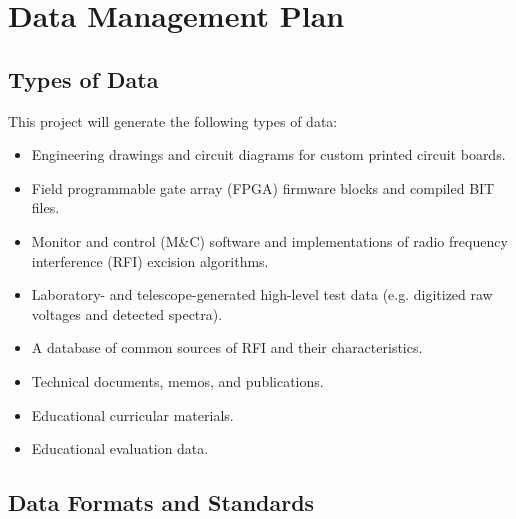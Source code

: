 \documentclass[10pt]{NSF}
\begin{document}
\section{Data Management Plan}
\label{sec:data_plan}

\subsection{Types of Data}

This project will generate the following types of data:
\begin{itemize}
\item{Engineering drawings and circuit diagrams for custom printed
  circuit boards.}
\item{Field programmable gate array (FPGA) firmware blocks and
  compiled BIT files.}
\item{Monitor and control (M\&C) software and implementations of radio
  frequency interference (RFI) excision algorithms.}
\item{Laboratory- and telescope-generated high-level test data
  (e.g. digitized raw voltages and detected spectra).}
\item{A database of common sources of RFI and their characteristics.}
\item{Technical documents, memos, and publications.}
\item{Educational curricular materials.}
\item{Educational evaluation data.}
\end{itemize}

\subsection{Data Formats and Standards}
\end{document}

